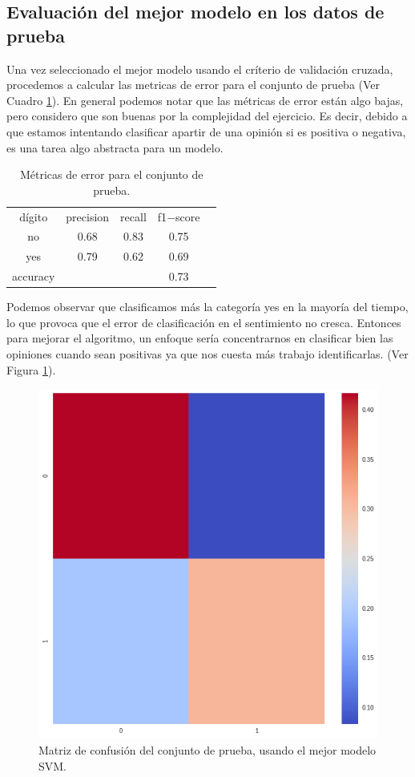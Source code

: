 \documentclass[paper=letter, fontsize=11pt]{scrartcl}
\numberwithin{equation}{section} %
\numberwithin{figure}{section} %
\numberwithin{table}{section} %
\begin{document}
\subsection{Evaluación del mejor modelo en los datos de prueba}
Una vez seleccionado el mejor modelo usando el críterio de validación cruzada, procedemos a calcular las metricas de error para el conjunto de prueba (Ver Cuadro \ref{error_o}). En general podemos notar que las métricas de error están algo bajas, pero considero que son buenas por la complejidad del ejercicio. Es decir, debido a que estamos intentando clasificar apartir de una opinión si es positiva o negativa, es una tarea algo abstracta para un modelo.
\begin{table}[H]
    \centering 
        \begin{tabular}{|c|c|c|c|c}
        \hline
dígito  & precision &  recall & f1$-$score\\
no      &  0.68  &  0.83   & 0.75\\  
yes      &  0.79  &  0.62   & 0.69\\   \hline \hline
accuracy  & & & 0.73\\ \hline \hline
        \end{tabular}
        \caption{Métricas de error para el conjunto de prueba.} \label{error_o}  
\end{table}
Podemos observar que clasificamos más la categoría yes en la mayoría del tiempo, lo que provoca que el error de clasificación en el sentimiento no cresca. Entonces para mejorar el algoritmo, un enfoque sería concentrarnos en clasificar bien las opiniones cuando sean positivas ya que nos cuesta más trabajo identificarlas. (Ver Figura \ref{ocho_o}).
\begin{figure}[H]
\centering
\includegraphics[scale=0.4]{figure/metrica_o.png}
\caption{Matriz de confusión del conjunto de prueba, usando el mejor modelo SVM.}\label{ocho_o}
\end{figure}
\end{document}
